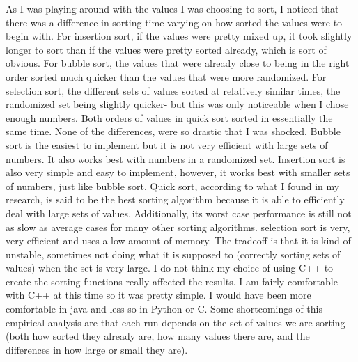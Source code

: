 \documentclass[10pt]{article}
\begin{document}
As I was playing around with the values I was choosing to sort, I noticed that there was a difference in sorting time varying on how sorted the values were to begin with. For insertion sort, if the values were pretty mixed up, it took slightly longer to sort than if the values were pretty sorted already, which is sort of obvious. For bubble sort, the values that were already close to being in the right order sorted much quicker than the values that were more randomized. For selection sort, the different sets of values sorted at relatively similar times, the randomized set being slightly quicker- but
this was only noticeable when I chose enough numbers. Both orders of values in quick sort sorted in essentially the same time. None of the differences, were so drastic
that I was shocked. Bubble sort is the easiest to implement but it is not very efficient with large sets of numbers. It also works best with numbers in a randomized set. Insertion sort is also very simple and easy to implement, however, it works best with smaller
sets of numbers, just like bubble sort. Quick sort, according to what I found in my research, is said to be the best sorting algorithm because it is able to efficiently deal with large sets of values. Additionally, its worst case performance is still not as slow as average cases for many other sorting algorithms. selection sort is very, very efficient and uses a low amount of memory. The tradeoff is that it is kind of unstable, sometimes not doing what it is supposed to (correctly sorting sets of values) when the set is very large. I do not think my choice of using C++ to create the sorting functions really affected the results. I am fairly comfortable with C++ at this time so it was pretty simple. I would have been more comfortable in java and less so in Python or C. Some shortcomings of this empirical analysis are that each run depends on the set of values we are sorting (both how sorted they already are, how many values there are, and the differences in how large or small they are).
\end{document}
